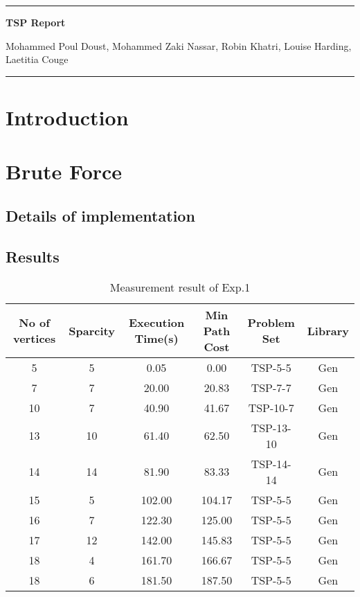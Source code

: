 \documentclass[a4paper, 11pt]{article}
\begin{document}
\begin{center}
\hrule

\vspace{.4cm}
{\bf {\Huge TSP Report}}
\vspace{.2cm}
\end{center}
{Mohammed Poul Doust,  Mohammed Zaki Nassar,  Robin Khatri,  Louise Harding,  Laetitia Couge}  \\
\hrule

\section{Introduction}

\section{Brute Force}

\subsection{Details of implementation}

\subsection{Results}

\begin{table}[!h]
\centering
\begin{tabular}{|c|c|c|c|c|c|}
	\hline
	No of vertices & Sparcity  & Execution Time(s) & Min Path Cost & Problem Set & Library  \\
	\hline\hline
	5 & 5 & 0.05 & 0.00 & TSP-5-5 & Gen\\
	\hline
	7 & 7 & 20.00 &20.83& TSP-7-7 & Gen\\
	\hline
	10 & 7 & 40.90 &41.67& TSP-10-7 & Gen\\
	\hline
	13 & 10 & 61.40 &62.50& TSP-13-10 & Gen\\
	\hline
	14 & 14 & 81.90 &83.33& TSP-14-14 & Gen\\
	\hline
	15 & 5 & 102.00 &104.17& TSP-5-5 & Gen\\
	\hline
	16 & 7 & 122.30 &125.00& TSP-5-5 & Gen\\
	\hline
	17 & 12 & 142.00 &145.83& TSP-5-5 & Gen\\
	\hline
	18 & 4 & 161.70 &166.67& TSP-5-5 & Gen\\
	\hline
	18 & 6 & 181.50 &187.50& TSP-5-5 & Gen\\
	\hline
\end{tabular}
\caption{Measurement result of Exp.1}
\label{t1}
\end{table}
\end{document}
